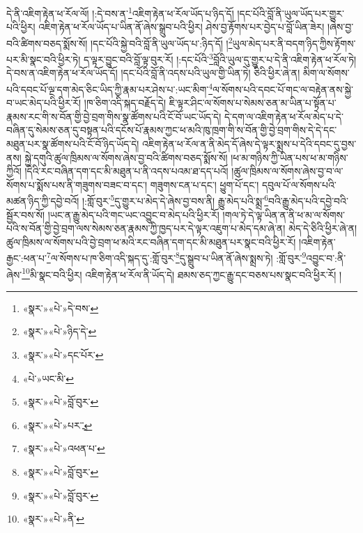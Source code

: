 དེ་ནི་འཇིག་རྟེན་ཕ་རོལ་ལོ། །:དེ་བས་ན་\footnote{«སྣར་»«པེ་»དེ་བས་}འཇིག་རྟེན་ཕ་རོལ་ཡོད་པ་ཉིད་དོ། །དང་པོའི་བློ་ནི་ཡུལ་ཡོད་པར་གྱུར་པའི་ཕྱིར། འཇིག་རྟེན་ཕ་རོལ་ཡོད་པ་ཡིན་ནོ་ཞེས་སྒྲུབ་པའི་ཕྱིར། ཤེས་བྱ་རྟོགས་པར་བྱེད་པ་བློ་ཡིན་ཟེར། །ཞེས་བྱ་བའི་ཚིགས་བཅད་སྨོས་སོ། །དང་པོའི་སྐྱེ་བའི་བློ་ནི་ཡུལ་ཡོད་པ་:ཉིད་དོ། །\footnote{«སྣར་»«པེ་»ཉིད་དེ་}ཡུལ་མེད་པར་ནི་བདག་ཉིད་ཀྱིས་རྟོགས་པར་མི་སྣང་བའི་ཕྱིར་ཏེ། ད་ལྟར་བྱུང་བའི་བློ་ལྟ་བུར་རོ། །:དང་པོའི་\footnote{«སྣར་»«པེ་»དང་པོར་}བློའི་ཡུལ་དུ་གྱུར་པ་དེ་ནི་འཇིག་རྟེན་ཕ་རོལ་ཏེ། དེ་བས་ན་འཇིག་རྟེན་ཕ་རོལ་ཡོད་དོ། །དང་པོའི་བློ་ནི་འདས་པའི་ཡུལ་གྱི་ཡིན་ཏེ། ཅིའི་ཕྱིར་ཞེ་ན། མིག་ལ་སོགས་པའི་དབང་པོ་ལྔ་དག་མེད་ཅིང་ཡིད་ཀྱི་རྣམ་པར་ཤེས་པ་:ཡང་མིག་\footnote{«པེ་»ཡང་མི་}ལ་སོགས་པའི་དབང་པོ་གང་ལ་བརྟེན་ནས་སྐྱེ་བ་ཡང་མེད་པའི་ཕྱིར་རོ། །ཁ་ཅིག་འདི་སྐད་བརྗོད་དེ། ཇི་ལྟར་ཤིང་ལ་སོགས་པ་སེམས་ཅན་མ་ཡིན་པ་སྟོན་པ་རྣམས་རང་གི་ས་བོན་གྱི་བྱེ་བྲག་གིས་སྣ་ཚོགས་པའི་ངོ་བོ་ཡང་ཡོད་དེ། དེ་དག་ལ་འཇིག་རྟེན་ཕ་རོལ་མེད་པ་དེ་བཞིན་དུ་སེམས་ཅན་དུ་བསྟན་པའི་དངོས་པོ་རྣམས་ཀྱང་ཕ་མའི་ཁུ་ཁྲག་གི་ས་བོན་གྱི་བྱེ་བྲག་གིས་དེ་དེ་དང་མཐུན་པར་སྣ་ཚོགས་པའི་ངོ་བོ་ཉིད་ཡོད་དེ། འཇིག་རྟེན་ཕ་རོལ་ན་ནི་མེད་དོ་ཞེས་དེ་ལྟར་སྨྲས་པ་དེའི་དབང་དུ་བྱས་ནས། སྐྱེ་དགུའི་ཚུལ་ཁྲིམས་ལ་སོགས་ཞེས་བྱ་བའི་ཚིགས་བཅད་སྨོས་སོ། །ཕ་མ་གཉིས་ཀྱི་ཡིན་པས་ཕ་མ་གཉིས་ཀྱིའོ། །དེའི་རང་བཞིན་དག་དང་མི་མཐུན་པ་ནི་འདས་པའམ་ཐ་དད་པའོ། །ཚུལ་ཁྲིམས་ལ་སོགས་ཞེས་བྱ་བ་ལ་སོགས་པ་སྨོས་པས་ནི་གཟུགས་བཟང་བ་དང་། གཟུགས་ངན་པ་དང་། ཕྱུག་པོ་དང་། དབུལ་པོ་ལ་སོགས་པའི་མཚན་ཉིད་ཀྱི་དབྱེ་བའོ། །:གློ་བུར་\footnote{«སྣར་»«པེ་»བློ་བུར་}དུ་གྱུར་པ་མེད་དེ་ཞེས་བྱ་བས་ནི། རྒྱུ་མེད་པའི་སྨྲ་\footnote{«སྣར་»«པེ་»པར་ྲ་}བའི་རྒྱུ་མེད་པའི་དབྱེ་བའི་སྦྱོར་བས་སོ། །ཡང་ན་རྒྱུ་མེད་པའི་གང་ཡང་འབྱུང་བ་མེད་པའི་ཕྱིར་རོ། །གལ་ཏེ་དེ་ལྟ་ཡིན་ན་ནི་ཕ་མ་ལ་སོགས་པའི་ས་བོན་གྱི་བྱེ་བྲག་ལས་སེམས་ཅན་རྣམས་ཀྱི་ཁྱད་པར་དེ་ལྟར་འཇུག་པ་མེད་དམ་ཞེ་ན། མེད་དེ་ཅིའི་ཕྱིར་ཞེ་ན། ཚུལ་ཁྲིམས་ལ་སོགས་པའི་བྱེ་བྲག་ཕ་མའི་རང་བཞིན་དག་དང་མི་མཐུན་པར་སྣང་བའི་ཕྱིར་རོ། །འཇིག་རྟེན་རྒྱང་:ཕན་པ་\footnote{«སྣར་»«པེ་»འཕན་པ་}ལ་སོགས་པ་ཁ་ཅིག་འདི་སྐད་དུ་:གློ་བུར་\footnote{«སྣར་»«པེ་»བློ་བུར་}དུ་སྒྲུབ་པ་ཡིན་ནོ་ཞེས་སྨྲས་ཏེ། :གློ་བུར་\footnote{«སྣར་»«པེ་»བློ་བུར་}འབྱུང་བ་:ནི་ཞེས་\footnote{«སྣར་»«པེ་»ནི་}མི་སྣང་བའི་ཕྱིར། འཇིག་རྟེན་ཕ་རོལ་ནི་ཡོད་དེ། ཐམས་ཅད་ཀྱང་རྒྱུ་དང་བཅས་པས་སྣང་བའི་ཕྱིར་རོ། །
